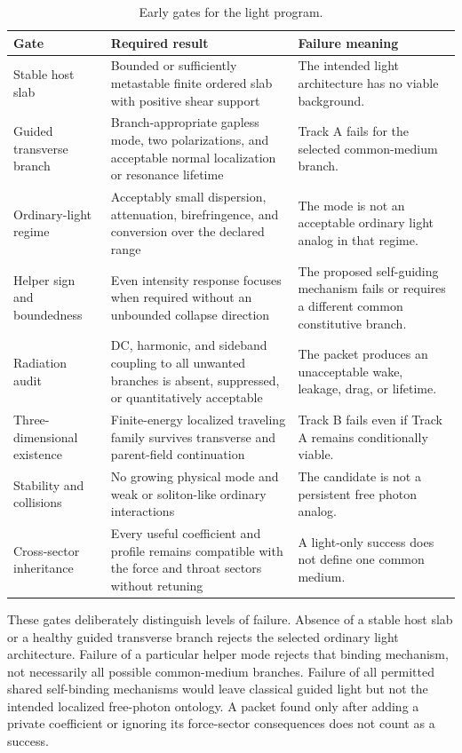 \begin{table}[htbp]
\centering
\caption{Early gates for the light program.}
\label{tab:light-early-gates}
\begin{tabularx}{\textwidth}{@{}L{0.25\textwidth}L{0.33\textwidth}Y@{}}
\toprule
\textbf{Gate} & \textbf{Required result} & \textbf{Failure meaning} \\
\midrule
Stable host slab
& Bounded or sufficiently metastable finite ordered slab with positive shear
  support
& The intended light architecture has no viable background. \\
Guided transverse branch
& Branch-appropriate gapless mode, two polarizations, and acceptable normal
  localization or resonance lifetime
& Track A fails for the selected common-medium branch. \\
Ordinary-light regime
& Acceptably small dispersion, attenuation, birefringence, and conversion over
  the declared range
& The mode is not an acceptable ordinary light analog in that regime. \\
Helper sign and boundedness
& Even intensity response focuses when required without an unbounded collapse
  direction
& The proposed self-guiding mechanism fails or requires a different common
  constitutive branch. \\
Radiation audit
& DC, harmonic, and sideband coupling to all unwanted branches is absent,
  suppressed, or quantitatively acceptable
& The packet produces an unacceptable wake, leakage, drag, or lifetime. \\
Three-dimensional existence
& Finite-energy localized traveling family survives transverse and parent-field
  continuation
& Track B fails even if Track A remains conditionally viable. \\
Stability and collisions
& No growing physical mode and weak or soliton-like ordinary interactions
& The candidate is not a persistent free photon analog. \\
Cross-sector inheritance
& Every useful coefficient and profile remains compatible with the force and
  throat sectors without retuning
& A light-only success does not define one common medium. \\
\bottomrule
\end{tabularx}
\end{table}

These gates deliberately distinguish levels of failure. Absence of a stable
host slab or a healthy guided transverse branch rejects the selected ordinary
light architecture. Failure of a particular helper mode rejects that binding
mechanism, not necessarily all possible common-medium branches. Failure of all
permitted shared self-binding mechanisms would leave classical guided light but
not the intended localized free-photon ontology. A packet found only after
adding a private coefficient or ignoring its force-sector consequences does not
count as a success.

